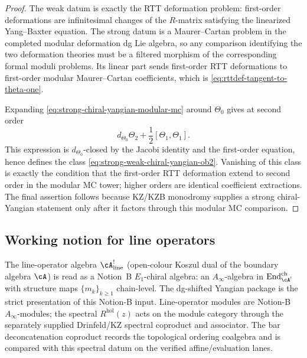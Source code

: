 \begin{proof}
The weak datum is exactly the RTT deformation problem: first-order
deformations are infinitesimal changes of the \(R\)-matrix satisfying the
linearized Yang--Baxter equation. The strong datum is a Maurer--Cartan
problem in the completed modular deformation dg Lie algebra, so any
comparison identifying the two deformation theories must be a filtered
morphism of the corresponding formal moduli problems. Its linear part
sends first-order RTT deformations to first-order modular
Maurer--Cartan coefficients, which is
\eqref{eq:rttdef-tangent-to-theta-one}.

Expanding \eqref{eq:strong-chiral-yangian-modular-mc} around
\(\Theta_0\) gives at second order
\[
d_{\Theta_0}\Theta_2+\frac12[\Theta_1,\Theta_1].
\]
This expression is \(d_{\Theta_0}\)-closed by the Jacobi identity and the
first-order equation, hence defines the class
\eqref{eq:strong-weak-chiral-yangian-ob2}. Vanishing of this class is
exactly the condition that the first-order RTT deformation extend to
second order in the modular MC tower; higher orders are identical
coefficient extractions. The final assertion follows because KZ/KZB
monodromy supplies a strong chiral-Yangian statement only after it
factors through this modular MC comparison.
\end{proof}

\subsection{Working notion for line operators}
\label{subsec:line-operators-working-notion}

\begin{convention}
\label{conv:line-operators-notion-b}
The line-operator algebra $\cA^!_{\mathrm{line}}$ (open-colour
Koszul dual of the boundary algebra $\cA$) is read as a Notion~B
$E_1$-chiral algebra: an $A_\infty$-algebra in
$\mathrm{End}^{\mathrm{ch}}_{\cA^!}$ with structure maps
$\{m_k\}_{k\ge 1}$ chain-level. The dg-shifted Yangian package is
the strict presentation of this Notion-B input. Line-operator
modules are Notion-B $A_\infty$-modules; the spectral
$R^{\mathrm{hol}}(z)$ acts on the module category through the
separately supplied Drinfeld/KZ spectral coproduct and associator.
The bar deconcatenation coproduct records the topological ordering
coalgebra and is compared with this spectral datum on the verified
affine/evaluation lanes.
\end{convention}

